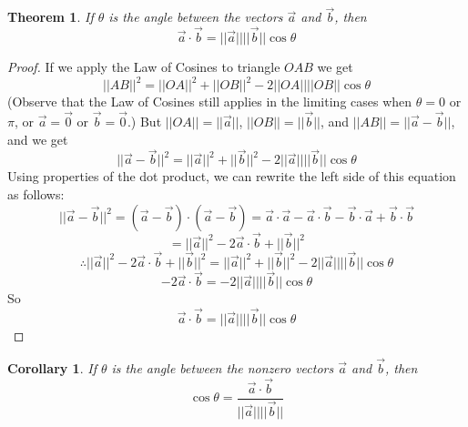 \documentclass[10pt]{report}
\newtheorem{thm2}{Theorem}[section]
\newtheorem{cor2}{Corollary}[section]
\begin{document}
\begin{thm2}
If $\theta$ is the angle between the vectors $\vec{a}$ and $\vec{b}$, then
$$\vec{a}\cdot\vec{b}=||\vec{a}||||\vec{b}||\cos \theta$$
\end{thm2}
\begin{proof}
If we apply the Law of Cosines to triangle $OAB$ we get
$$||AB||^2 = ||OA||^2 + ||OB||^2 - 2||OA||||OB||\cos \theta$$
(Observe that the Law of Cosines still applies in the limiting cases when $\theta=0$ or $\pi$, or $\vec{a}=\vec{0}$ or $\vec{b}=\vec{0}$.) But $||OA||=||\vec{a}||$, $||OB|| = ||\vec{b}||$, and $||AB|| = ||\vec{a}-\vec{b}||$, and we get
$$||\vec{a}-\vec{b}||^2 = ||\vec{a}||^2 + ||\vec{b}||^2-2||\vec{a}||||\vec{b}||\cos \theta$$
Using properties of the dot product, we can rewrite the left side of this equation as follows:
$$||\vec{a}-\vec{b}||^2 = (\vec{a}-\vec{b})\cdot (\vec{a}-\vec{b}) = \vec{a} \cdot \vec{a} - \vec{a} \cdot \vec{b} - \vec{b}\cdot \vec{a} + \vec{b}\cdot \vec{b}$$
$$=||\vec{a}||^2 - 2\vec{a}\cdot \vec{b} + ||\vec{b}||^2$$
$$\therefore ||\vec{a}||^2 - 2\vec{a}\cdot \vec{b} + ||\vec{b}||^2 = ||\vec{a}||^2 + ||\vec{b}||^2 - 2||\vec{a}||||\vec{b}||\cos \theta$$
$$-2\vec{a}\cdot \vec{b} = -2||\vec{a}||||\vec{b}||\cos \theta$$
So
$$\vec{a}\cdot \vec{b} = ||\vec{a}||||\vec{b}||\cos \theta$$
\end{proof}
\begin{cor2}
If $\theta$ is the angle between the nonzero vectors $\vec{a}$ and $\vec{b}$, then
$$\cos \theta = \frac{\vec{a}\cdot \vec{b}}{||\vec{a}||||\vec{b}||}$$
\end{cor2}
\end{document}
